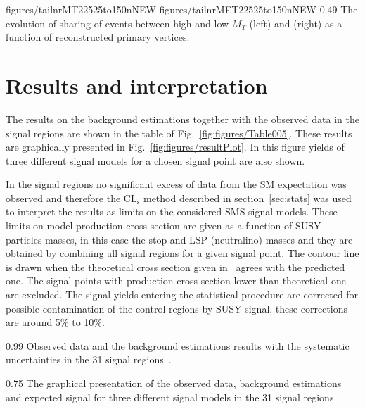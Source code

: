                  {figures/tailnrMT22525to150nNEW} %
                 {figures/tailnrMET22525to150nNEW} %
                 {0.49}       %
                 { The evolution of sharing of events between high and low $M_{T}$ (left) and \MET (right) as a function of reconstructed primary vertices. }
\newpage

\section{Results and interpretation~\label{sec:results}}

The results on the background estimations together with the observed data in the signal regions are shown in the table of Fig.~\ref{fig:figures/Table005}. These results are graphically presented in Fig.~\ref{fig:figures/resultPlot}. In this figure yields of three different signal models for a chosen signal point are also shown. 

In the signal regions no significant excess of data from the SM expectation was observed and therefore the $\mathrm{CL_{s}}$ method described in section~\ref{sec:stats} was used to interpret the results as limits on the considered SMS signal models. These limits on model production cross-section are given as a function of SUSY particles masses, in this case the stop and LSP (neutralino) masses and they are obtained by combining all signal regions for a given signal point. The contour line is drawn when the theoretical cross section given in~\cite{Borschensky:2014cia} agrees with the predicted one. The signal points with production cross section lower than theoretical one are excluded. The signal yields entering the statistical procedure are corrected for possible contamination of the control regions by SUSY signal, these corrections are around 5\% to 10\%.

                 {0.99}       %
                 { Observed data and the background estimations results with the systematic uncertainties in the 31 signal regions~\cite{Sirunyan:2017xse}. }

                 {0.75}       %
                 { The graphical presentation of the observed data, background estimations and expected signal for three different signal models in the 31 signal regions~\cite{Sirunyan:2017xse}. }

